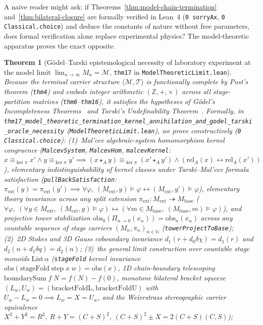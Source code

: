 \documentclass[11pt,a4paper]{article}
\newtheorem{theorem}{Theorem}[section]
\theoremstyle{definition}
\theoremstyle{remark}
\begin{document}
A naive reader might ask: if Theorems~\ref{thm:model-chain-termination} and~\ref{thm:bilateral-closure} are formally verified in Lean~4 (\texttt{0 sorryAx}, \texttt{0 Classical.choice}) and deduce the constants of nature without free parameters, does formal verification alone replace experimental physics? The model-theoretic apparatus proves the exact opposite.

\begin{theorem}[G\"odel--Tarski epistemological necessity of laboratory experiment at the model limit $\lim_{n\to\infty} M_n = \mathcal{M}$, \texttt{thm17} in \texttt{ModelTheoreticLimit.lean}]
\label{thm:godel-tarski-experiment}
Because the terminal carrier structure $\langle\mathcal{M},\mathcal{T}\rangle$ is functionally complete by Post's theorem (\texttt{thm4}) and embeds integer arithmetic $(\mathbb{Z},+,\times)$ across all stage-partition matrices (\texttt{thm6}--\texttt{thm16}), it satisfies the hypotheses of G\"odel's Incompleteness Theorems~\cite{Godel1931} and Tarski's Undefinability Theorem~\cite{Tarski1936}. Formally, in \texttt{thm17\_model\_theoretic\_termination\_kernel\_annihilation\_and\_godel\_tarski\_oracle\_necessity} (\texttt{ModelTheoreticLimit.lean}), we prove constructively (\texttt{0 Classical.choice}):
(1)~Mal'cev algebraic-system homomorphism kernel congruence (\texttt{MalcevSystem}, \texttt{MalcevHom}, \texttt{malcevKernel}: $x\equiv_{\ker\pi} x'\land y\equiv_{\ker\pi} y'\implies (x\star_A y)\equiv_{\ker\pi}(x'\star_A y')\land (\mathrm{rel}_A(x)\leftrightarrow\mathrm{rel}_A(x'))$), elementary indistinguishability of kernel classes under Tarski--Mal'cev formula satisfaction (\texttt{pullBackSatisfaction}: $\pi_{\mathrm{ext}}(y)=\pi_{\mathrm{ext}}(y')\implies \forall\varphi,\ (M_{\mathrm{ext}},y)\models\varphi\leftrightarrow(M_{\mathrm{ext}},y')\models\varphi$), elementary theory invariance across any split extension $\pi_{\mathrm{ext}} : M_{\mathrm{ext}}\twoheadrightarrow M_{\mathrm{base}}$ ($\forall\varphi,\ (\forall y\in M_{\mathrm{ext}},\ (M_{\mathrm{ext}},y)\models\varphi)\leftrightarrow(\forall m\in M_{\mathrm{base}},\ (M_{\mathrm{base}},m)\models\varphi)$), and projective tower stabilization $\mathrm{obs}_0(\Pi_{n\to 0}(x_n)) = \mathrm{obs}_n(x_n)$ across any countable sequence of stage carriers $(M_n,\pi_n)_{n\in\mathbb{N}}$ (\texttt{towerProjectToBase});
(2)~2D Stokes and 3D Gauss coboundary invariance $d_1(r+d_0\delta\chi)=d_1(r)$ and $d_2(n+d_1\delta q)=d_2(n)$;
(3)~the general limit construction over countable stage monoids $\mathrm{List}\,\alpha$ (\texttt{stageFold} kernel invariance $\mathrm{obs}(\mathrm{stageFold}\;\mathrm{step}\;x\;w)=\mathrm{obs}(x)$, 1D chain-boundary telescoping $\mathrm{boundarySum}\;f\;N = f(N)-f(0)$, monotone bilateral bracket squeeze $(L_w,U_w) = (\mathrm{bracketFoldL},\mathrm{bracketFoldU})$ with $U_w-L_w=0\implies L_w=X=U_w$, and the Weierstrass stereographic carrier equivalence $X^2+Y^2=R^2,\ R+Y=(C+S)^2,\ (C+S)^2\pm X = 2(C+S)(C,S)$);

\end{theorem}
\end{document}
